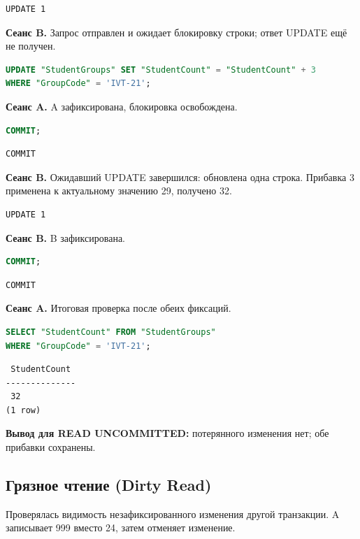\documentclass[12pt,a4paper]{article}
\begin{document}
\begin{lstlisting}
UPDATE 1
\end{lstlisting}

\textbf{Сеанс B.} Запрос отправлен и ожидает блокировку строки; ответ UPDATE ещё не получен.
\begin{lstlisting}[language=SQL]
UPDATE "StudentGroups" SET "StudentCount" = "StudentCount" + 3
WHERE "GroupCode" = 'IVT-21';
\end{lstlisting}

\textbf{Сеанс A.} A зафиксирована, блокировка освобождена.
\begin{lstlisting}[language=SQL]
COMMIT;
\end{lstlisting}

\begin{lstlisting}
COMMIT
\end{lstlisting}

\textbf{Сеанс B.} Ожидавший UPDATE завершился: обновлена одна строка. Прибавка 3 применена к актуальному значению 29, получено 32.

\begin{lstlisting}
UPDATE 1
\end{lstlisting}

\textbf{Сеанс B.} B зафиксирована.
\begin{lstlisting}[language=SQL]
COMMIT;
\end{lstlisting}

\begin{lstlisting}
COMMIT
\end{lstlisting}

\textbf{Сеанс A.} Итоговая проверка после обеих фиксаций.
\begin{lstlisting}[language=SQL]
SELECT "StudentCount" FROM "StudentGroups"
WHERE "GroupCode" = 'IVT-21';
\end{lstlisting}

\begin{lstlisting}
 StudentCount
--------------
 32
(1 row)
\end{lstlisting}

\textbf{Вывод для READ UNCOMMITTED:} потерянного изменения нет; обе прибавки сохранены.

\subsection*{Грязное чтение (Dirty Read)}

Проверялась видимость незафиксированного изменения другой транзакции. A записывает 999 вместо 24, затем отменяет изменение.
\end{document}
